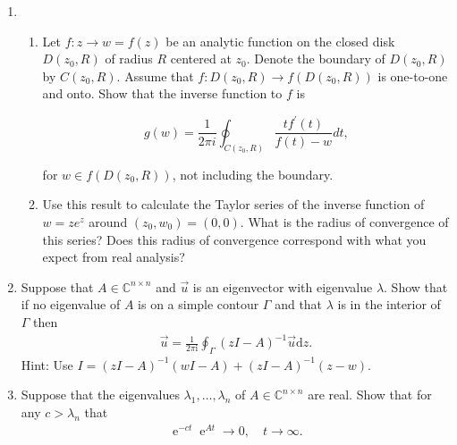 \documentclass[10pt]{amsart}
\newcommand{\D}{\mathrm{d}}
\newcommand{\I}{\mathrm{i}}
\DeclareMathOperator{\E}{e}
\theoremstyle{nonumberplain}
\begin{document}
\mline
\begin{enumerate}[label={\bf {\arabic*}:}]

\item
  \begin{enumerate}
    \item Let $f: z \rightarrow w=f(z)$ be an analytic function on the closed disk $D\left(z_0, R\right)$ of radius $R$ centered at $z_0$. Denote the boundary of $D\left(z_0, R\right)$ by $C\left(z_0, R\right)$. Assume that $f: D\left(z_0, R\right) \rightarrow f\left(D\left(z_0, R\right)\right)$ is one-to-one and onto. Show that the inverse function to $f$ is

$$
g(w)=\frac{1}{2 \pi i} \oint_{C\left(z_0, R\right)} \frac{t f^{\prime}(t)}{f(t)-w} d t,
$$

for $w \in f\left(D\left(z_0, R\right)\right)$, not including the
boundary.
\item Use this result to calculate the Taylor series of the inverse
  function of $w=z e^z$ around $\left(z_0, w_0\right)=(0,0)$. What is
  the radius of convergence of this series? Does this radius of
  convergence correspond with what you expect from real analysis?\\

  \end{enumerate}
\item Suppose that $A \in \mathbb C^{n \times n}$ and $\vec u$ is an
  eigenvector with eigenvalue $\lambda$.  Show that if no eigenvalue
  of $A$ is on a simple contour $\Gamma$ and that $\lambda$ is in the
  interior of $\Gamma$ then
  \begin{align*}
    \vec u = \frac{1}{2 \pi \I} \oint_{\Gamma} ( z I - A)^{-1} \vec u \D z.
  \end{align*}
  Hint: Use $I = (z I - A)^{-1} (w I - A)  + (z I - A)^{-1} (z -
  w)$.\\

\item Suppose that the eigenvalues $\lambda_1,\ldots,\lambda_n$ of $A \in \mathbb C^{n \times n}$
  are real.  Show that for any $c > \lambda_n$ that
  \begin{align*}
    \E^{-c t} \E^{A t} \to 0, \quad t \to \infty.
  \end{align*}


\end{enumerate}
\end{document}
